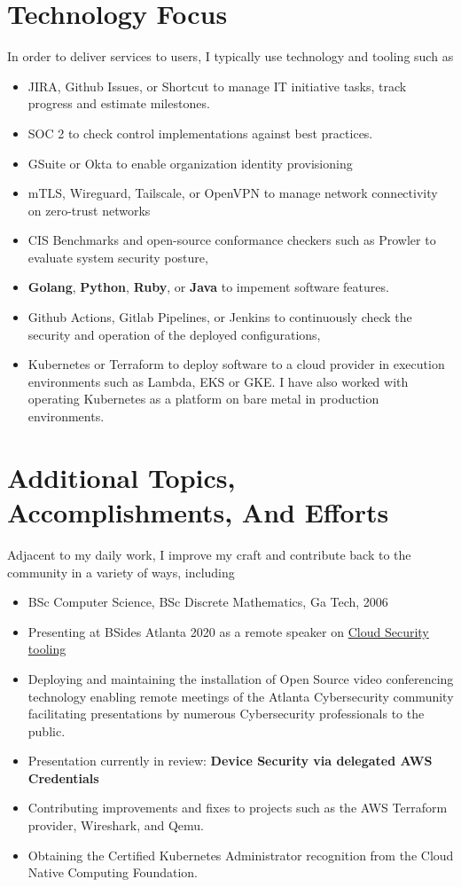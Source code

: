 \documentclass[letterpaper,10pt]{article}
\begin{document}
\section{Technology Focus}
In order to deliver services to users, I typically use technology and tooling such as
\begin{itemize}
	\setlength\itemsep{0.1em}
	\item JIRA, Github Issues, or Shortcut to manage IT initiative tasks, track progress and estimate milestones.
	\item SOC 2 to check control implementations against best practices.
	\item GSuite or Okta to enable organization identity provisioning
	\item mTLS, Wireguard, Tailscale, or OpenVPN to manage network connectivity on zero-trust networks
	\item CIS Benchmarks and open-source conformance checkers such as Prowler to evaluate system security posture,
	\item \textbf{Golang},  \textbf{Python},  \textbf{Ruby}, or \textbf{Java} to impement software features.
	\item Github Actions, Gitlab Pipelines, or Jenkins to continuously check the security and operation of the deployed configurations,
	\item Kubernetes or Terraform to deploy software to a cloud provider in execution environments such as Lambda, EKS or GKE. I have also worked with operating Kubernetes as a platform on bare metal in production environments.
\end{itemize}

\section{Additional Topics, Accomplishments, And Efforts}
Adjacent to my daily work, I improve my craft and contribute back to the community in a variety of ways, including
\begin{itemize}
	\setlength\itemsep{0.1em}
	\item BSc Computer Science, BSc Discrete Mathematics, Ga Tech, 2006
	\item Presenting at BSides Atlanta 2020 as a remote speaker on \href{https://www.youtube.com/watch?v=kLCaAaUd1mM}{\color{blue}Cloud Security tooling}
	\item Deploying and maintaining the installation of Open Source video conferencing technology enabling remote meetings of the Atlanta Cybersecurity community facilitating presentations by numerous Cybersecurity professionals to the public.
	\item Presentation currently in review: \textbf{Device Security via delegated AWS Credentials}
	\item Contributing improvements and fixes to projects such as the AWS Terraform provider, Wireshark, and Qemu.
	\item Obtaining the Certified Kubernetes Administrator recognition from the Cloud Native Computing Foundation.
\end{itemize}
\end{document}
